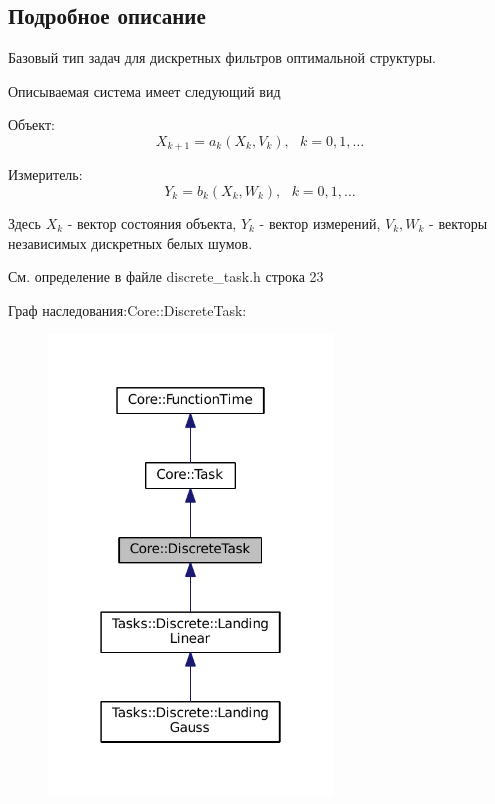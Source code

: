 \subsection{Подробное описание}
Базовый тип задач для дискретных фильтров оптимальной структуры. 

Описываемая система имеет следующий вид


\begin{DoxyItemize}
\item Объект\+: \[X_{k+1} = a_k(X_k, V_k),\ \ \ k = 0, 1, \ldots\]
\item Измеритель\+: \[Y_k = b_k(X_k, W_k),\ \ \ k = 0, 1, \ldots\]
\end{DoxyItemize}

Здесь $X_k$ -\/ вектор состояния объекта, $Y_k$ -\/ вектор измерений, $V_k, W_k$ -\/ векторы независимых дискретных белых шумов. 

См. определение в файле discrete\+\_\+task.\+h строка 23



Граф наследования\+:Core\+:\+:Discrete\+Task\+:\nopagebreak
\begin{figure}[H]
\begin{center}
\leavevmode
\includegraphics[width=214pt]{class_core_1_1_discrete_task__inherit__graph}
\end{center}
\end{figure}


